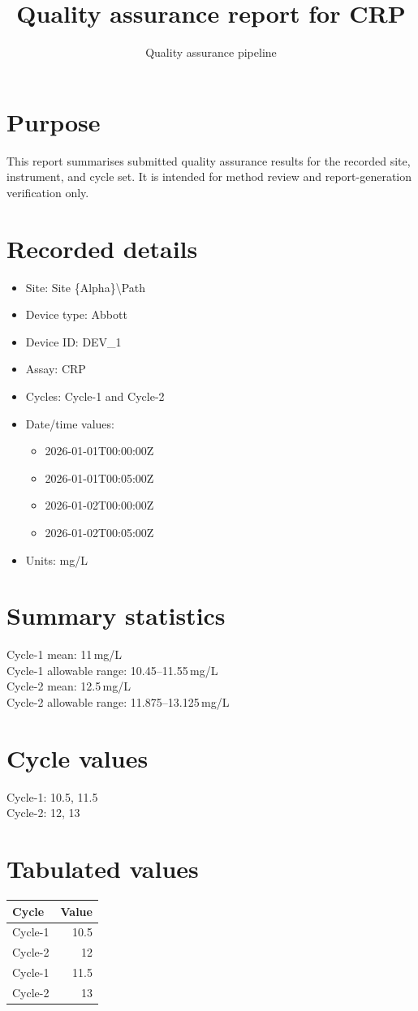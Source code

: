 \documentclass{article}
\title{Quality assurance report for CRP}
\author{Quality assurance pipeline}
\date{}
\begin{document}
\maketitle

\section*{Purpose}
This report summarises submitted quality assurance results for the recorded site, instrument, and cycle set. It is intended for method review and report-generation verification only.

\section*{Recorded details}
\begin{itemize}
  \item Site: Site \{Alpha\}\textbackslash{}Path
  \item Device type: Abbott
  \item Device ID: DEV\_1
  \item Assay: CRP
  \item Cycles: Cycle-1 and Cycle-2
  \item Date/time values:
  \begin{itemize}
  \item 2026-01-01T00:00:00Z
  \item 2026-01-01T00:05:00Z
  \item 2026-01-02T00:00:00Z
  \item 2026-01-02T00:05:00Z
  \end{itemize}
  \item Units: mg/L
\end{itemize}

\section*{Summary statistics}
Cycle-1 mean: 11\,mg/L\\
Cycle-1 allowable range: 10.45--11.55\,mg/L\\
Cycle-2 mean: 12.5\,mg/L\\
Cycle-2 allowable range: 11.875--13.125\,mg/L

\section*{Cycle values}
Cycle-1: 10.5, 11.5\\
Cycle-2: 12, 13

\section*{Tabulated values}
\begin{tabular}{lr}
Cycle & Value \\ \hline
Cycle-1 & 10.5 \\
Cycle-2 & 12 \\
Cycle-1 & 11.5 \\
Cycle-2 & 13 \\
\end{tabular}
\end{document}
